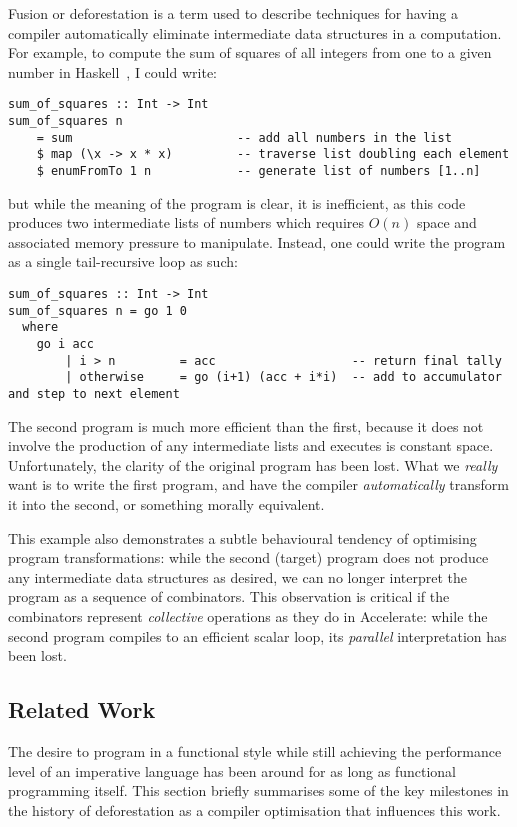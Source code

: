 Fusion or deforestation is a term used to describe techniques for having a
compiler automatically eliminate intermediate data structures in a computation.
For example, to compute the sum of squares of all integers from one to a given
number in Haskell~\cite{Haskell:1998}, I could write:
%
\begin{lstlisting}[style=haskell]
sum_of_squares :: Int -> Int
sum_of_squares n
    = sum                       -- add all numbers in the list
    $ map (\x -> x * x)         -- traverse list doubling each element
    $ enumFromTo 1 n            -- generate list of numbers [1..n]
\end{lstlisting}
%
but while the meaning of the program is clear, it is inefficient, as this code
produces two intermediate lists of numbers which requires $O(n)$ space and
associated memory pressure to manipulate. Instead, one could write the program
as a single tail-recursive loop as such:
%
\begin{lstlisting}[style=haskell]
sum_of_squares :: Int -> Int
sum_of_squares n = go 1 0
  where
    go i acc
        | i > n         = acc                   -- return final tally
        | otherwise     = go (i+1) (acc + i*i)  -- add to accumulator and step to next element
\end{lstlisting}
%
The second program is much more efficient than the first, because it does not
involve the production of any intermediate lists and executes is constant space.
Unfortunately, the clarity of the original program has been lost. What we
\emph{really} want is to write the first program, and have the compiler
\emph{automatically} transform it into the second, or something morally
equivalent.

This example also demonstrates a subtle behavioural tendency of optimising
program transformations: while the second (target) program does not produce any
intermediate data structures as desired, we can no longer interpret the program
as a sequence of combinators. This observation is critical if the combinators
represent \emph{collective} operations as they do in Accelerate: while the
second program compiles to an efficient scalar loop, its \emph{parallel}
interpretation has been lost.


\subsection{Related Work}

The desire to program in a functional style while still achieving the
performance level of an imperative language has been around for as long as
functional programming itself. This section briefly summarises some of the key
milestones in the history of deforestation as a compiler optimisation that
influences this work.


